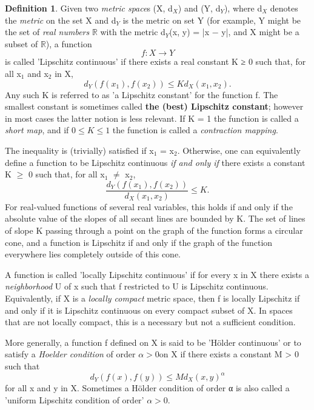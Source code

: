 \documentclass[10pt, oneside, reqno]{amsbook}
\theoremstyle{plain}%
\theoremstyle{definition}
\theoremstyle{rem}
\theoremstyle{definition}
\newtheorem{dfn}[thm]{Definition}
\def\Rbb{\ensuremath{\mathbb{R}}}
\numberwithin{equation}{chapter}
\begin{document}
\begin{dfn}
 Given two \textit{metric space}s (X, d$_X$) and (Y, d$_Y$), where d$_X$ 
denotes the \textit{metric} on the set X and d$_Y$ is the metric on set Y (for example, Y might be the set of 
\textit{real numbers} \Rbb 
with the metric d$_Y$(x, y) = |x − y|, and X might be a subset of \Rbb), a function 
\begin{displaymath}\displaystyle f: X \to Y\end{displaymath} 
is called 'Lipschitz continuous' if there exists a real constant K ≥ 0 such that, for all x$_1$ and x$_2$ in X,
\begin{displaymath} d_Y(f(x_1), f(x_2)) \le K d_X(x_1, x_2).\end{displaymath}
Any  such K is referred to as  'a Lipschitz constant' for the function f. 
The smallest constant is sometimes called \textbf{the (best) Lipschitz constant}; 
however in most cases the latter notion is less relevant. 
If K = 1 the function is called a	\textit{short map}, 
and if $0 \leq K \leq 1$ the function is called a \textit{contraction mapping}.

The inequality is (trivially) satisfied if x$_1$ = x$_2$. Otherwise, one can equivalently 
define a function to be Lipschitz continuous 			\textit{if and only if} 
there exists a constant K $\geq$ 0 such that, for all x$_1$ $\neq$ x$_2$,  
\begin{displaymath}\frac{d_Y(f(x_1),f(x_2))}{d_X(x_1,x_2)}\le K.\end{displaymath}
For real-valued functions of several real variables, this holds if and only 
if the absolute value of the slopes of all secant lines are bounded by K.  
The set of lines of slope K passing through a point on the graph of the function forms a circular cone,
 and a function is Lipschitz if and only if the graph of the function everywhere lies completely outside
 of this cone.

A function is called 'locally Lipschitz continuous' if for every x in X there exists a 	
\textit{neighborhood} U of x such that f restricted to U is Lipschitz continuous.  
Equivalently, if X is a \textit{locally compact} metric space, then f is locally Lipschitz 
if and only if it is Lipschitz continuous on every compact subset of X. 
 In spaces that are not locally compact, this is a necessary but not a sufficient condition.

More generally, a function f defined on X is said to be 'Hölder continuous' or to satisfy a 			
\textit{Hoelder condition} of order $\alpha > 0$on X if there exists a constant M > 0 such that
\begin{displaymath}\displaystyle d_Y(f(x), f(y)) \leq M d_X(x,  y)^{\alpha}\end{displaymath} 
for all x and y in X. Sometimes a Hölder condition of order α is also called a 'uniform Lipschitz 
condition of order' $\alpha > 0$.


\end{dfn}
\end{document}
